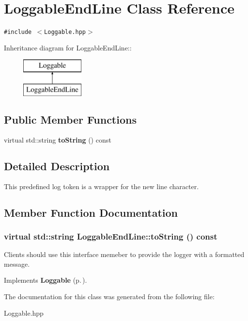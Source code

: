 \section{Loggable\-End\-Line Class Reference}
\label{classLoggableEndLine}
{\tt \#include $<$Loggable.hpp$>$}

Inheritance diagram for Loggable\-End\-Line::\begin{figure}[H]
\begin{center}
\leavevmode
\includegraphics[height=2cm]{classLoggableEndLine}
\end{center}
\end{figure}
\subsection*{Public Member Functions}
\begin{CompactItemize}
\item 
virtual std::string {\bf to\-String} () const 
\end{CompactItemize}


\subsection{Detailed Description}
This predefined log token is a wrapper for the new line character.



\subsection{Member Function Documentation}
\subsubsection{\setlength{\rightskip}{0pt plus 5cm}virtual std::string Loggable\-End\-Line::to\-String () const\hspace{0.3cm}{\tt  [inline, virtual]}}\label{classLoggableEndLine_a0}


Clients should use this interface memeber to provide the logger with a formatted message.

Implements {\bf Loggable} {\rm (p.\,\pageref{classLoggable_a0})}.

The documentation for this class was generated from the following file:\begin{CompactItemize}
\item 
Loggable.hpp\end{CompactItemize}
